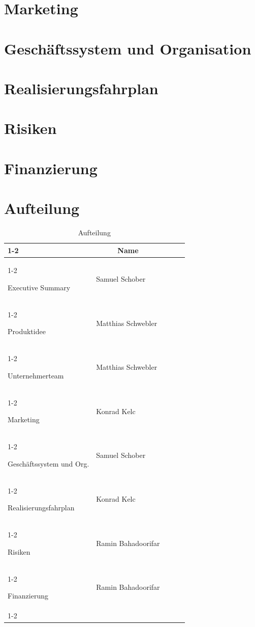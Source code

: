 \documentclass[11pt]{article}
\begin{document}
\section{Marketing}
\section{Gesch\"aftssystem und Organisation}
\section{Realisierungsfahrplan}
\section{Risiken}
\section{Finanzierung}

\newpage
\section{Aufteilung}
\begin{table}[ht]
	\centering
	\begin{tabular}{|l|l|lll}
		\cline{1-2}
		\multicolumn{1}{|c|}{\textbf{\rule{0pt}{3ex} Thema}} & \multicolumn{1}{c|}{\textbf{Name}} &  &  &  \\ \cline{1-2}
		
		\rule{0pt}{3ex} Executive Summary                    & Samuel Schober                     &  &  &  \\ \cline{1-2}
		\rule{0pt}{3ex} Produktidee                          & Matthias Schwebler                 &  &  &  \\ \cline{1-2}
		\rule{0pt}{3ex} Unternehmerteam                      & Matthias Schwebler                 &  &  &  \\ \cline{1-2}
		\rule{0pt}{3ex} Marketing                            & Konrad Kelc                        &  &  &  \\ \cline{1-2}
		\rule{0pt}{3ex} Gesch\"aftssystem und Org.           & Samuel Schober                     &  &  &  \\ \cline{1-2}
		\rule{0pt}{3ex} Realisierungsfahrplan                & Konrad Kelc                        &  &  &  \\ \cline{1-2}
		\rule{0pt}{3ex} Risiken                              & Ramin Bahadoorifar                 &  &  &  \\ \cline{1-2}
		\rule{0pt}{3ex} Finanzierung                         & Ramin Bahadoorifar                 &  &  &  \\ \cline{1-2}
	\end{tabular}
	\caption{Aufteilung}
\end{table}
\end{document}
